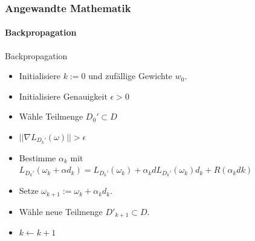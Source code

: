 \documentclass{beamer}
\begin{document}
\begin{frame}
    \frametitle{Angewandte Mathematik}
\framesubtitle{Backpropagation}
    \begin{block}{Backpropagation}
\begin{itemize}
\item  Initialisiere $k:=0$ und zufällige Gewichte $w_0$.
\item  Initialisiere Genauigkeit $\epsilon > 0$
\item  Wähle Teilmenge $D_0' \subset D$
\item    {} {$|| \nabla L_{D_k'}(\omega) || > \epsilon$}  
\item  Bestimme $\alpha_k$  mit $ L_{D_k'}(\omega_k + \alpha d_k) =  L_{D_k'}(\omega_k) + \alpha_k d L_{D_k'}(\omega_k)d_k + R( \alpha_k dk)$ 
\item   Setze $\omega_{k+1} := \omega_k  + \alpha_k d_k$. 
\item  Wähle neue Teilmenge $D'_{k +1} \subset D$.
\item  $k \leftarrow k+1$
\end{itemize}
\end{block}
 \end{frame}
\end{document}
